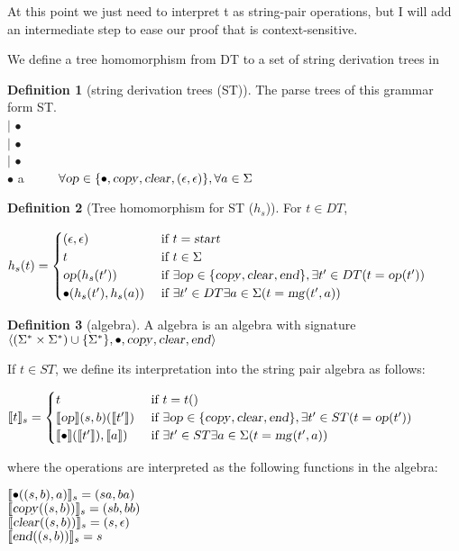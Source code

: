 \documentclass[12pt]{article}
\theoremstyle{definition}
\newtheorem{definition}{Definition}[section]
\begin{document}
At this point we just need to interpret t as string-pair operations, but I will add an intermediate step to ease our proof that \OURG is context-sensitive.

We define a tree homomorphism from DT to a set of string derivation trees in

\begin{definition}[string derivation trees (ST)]
  The parse trees of this grammar form ST.\\
  
\noindent  \cp \arr \cp $|$ $\bullet$\\
  \cl \arr \cp $|$ $\bullet$\\
  \ed \arr \cp $|$ $\bullet$\\
  $\bullet$ \arr \op a ~~~~ $\forall \text{\textsl{op}}\in \{\bullet,\text{\textsl{copy}},\text{\textsl{clear}},(\epsilon,\epsilon)\}, \forall a\in\Sigma$
\end{definition}


\begin{definition}[Tree homomorphism for ST ($h_s$)]

  For $t\in DT$, 
  
  $
  h_s(t) =
  \begin{cases}
    (\epsilon,\epsilon) & \text{ if } t = \text{\textsl{start}}\\
    t & \text{ if } t\in\Sigma\\
    \text{\textsl{op}}(h_s(t')) & \text{ if } \exists \text{\textsl{op}} \in \{\text{\textsl{copy}},\text{\textsl{clear}},\text{\textsl{end}}\}, \exists t'\in DT (t=\text{\textsl{op}}(t'))\\
    \bullet(h_s(t'), h_s(a)) & \text{ if } \exists t'\in DT \exists a\in\Sigma (t=\text{\textsl{mg}}(t',a))\\
  \end{cases}
  $
\end{definition}


\begin{definition}[\OURG algebra]
  A \OURG algebra is an algebra with signature $\langle (\Sigma^*\times\Sigma^*)\cup\{\Sigma^*\},\bullet,\text{\textsl{copy}},\text{\textsl{clear}},\text{\textsl{end}}\rangle$
  
  If $t\in ST$, we define its interpretation into the string pair algebra as follows:

   $
  \llbracket t \rrbracket_s =
  \begin{cases}
    t & \text{ if } t = t()\\
    \llbracket\text{\textsl{op}}\rrbracket(s,b)(\llbracket t'\rrbracket) & \text{ if } \exists \text{\textsl{op}} \in \{\text{\textsl{copy}},\text{\textsl{clear}},\text{\textsl{end}}\}, \exists t'\in ST (t=\text{\textsl{op}}(t'))\\
    \llbracket\bullet\rrbracket(\llbracket t'\rrbracket), \llbracket a\rrbracket) & \text{ if } \exists t'\in ST \exists a\in\Sigma (t=\text{\textsl{mg}}(t',a))\\
  \end{cases}
  $

  where the operations are interpreted as the following functions in the algebra:
  
\noindent  $\llbracket\bullet((s,b),a)\rrbracket_s = (sa,ba)$\\  
  $\llbracket\text{\textsl{copy}}((s,b))\rrbracket_s = (sb,bb)$\\
  $\llbracket\text{\textsl{clear}}((s,b))\rrbracket_s = (s,\epsilon)$\\
  $\llbracket\text{\textsl{end}}((s,b))\rrbracket_s = s$\\

  
\end{definition}
\end{document}
